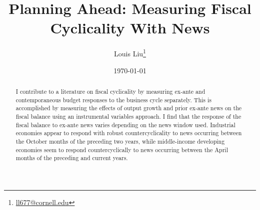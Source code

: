\documentclass[12pt]{article}
\begin{document}
\title{{\LARGE Planning Ahead: Measuring Fiscal Cyclicality With News}}

\author{%
        \vspace{-0.5cm} {\large Louis Liu}\thanks{%
        \href{mailto:ll677@cornell.edu}{ll677@cornell.edu}} \\
}


\vspace{-3mm} 
\date{\today}
\maketitle

\vspace{-8mm} 
\begin{abstract}
\begin{singlespace}

I contribute to a literature on fiscal cyclicality by measuring ex-ante and contemporaneous budget responses to the business cycle separately. This is accomplished by  measuring the effects of output growth and prior ex-ante news on the fiscal balance using an  instrumental variables approach. I find that the response of the fiscal balance to ex-ante news varies depending on the news window used. Industrial economies appear to respond with robust  countercyclicality to news occurring between the October months of the preceding two years,  while middle-income developing economies seem to respond countercyclically to news  occurring between the April months of the preceding and current years. 


\end{singlespace}
\end{abstract}
\end{document}
